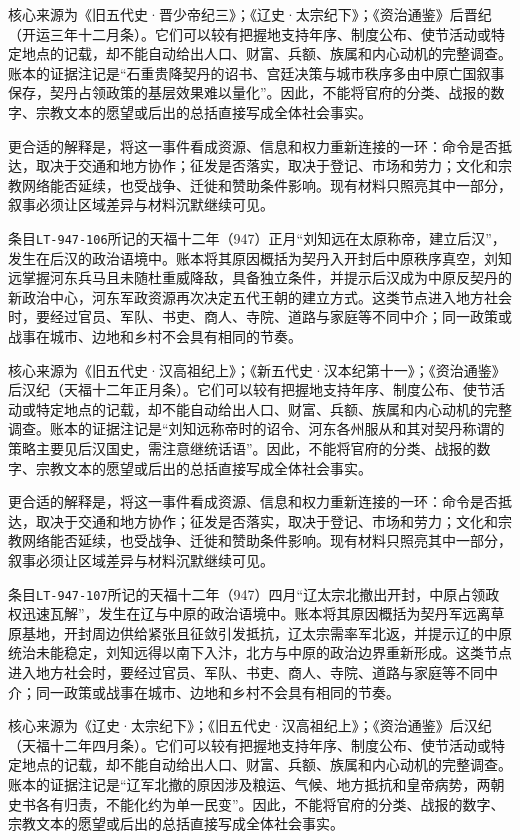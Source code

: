 核心来源为《旧五代史·晋少帝纪三》；《辽史·太宗纪下》；《资治通鉴》后晋纪（开运三年十二月条）。它们可以较有把握地支持年序、制度公布、使节活动或特定地点的记载，却不能自动给出人口、财富、兵额、族属和内心动机的完整调查。账本的证据注记是“石重贵降契丹的诏书、宫廷决策与城市秩序多由中原亡国叙事保存，契丹占领政策的基层效果难以量化”。因此，不能将官府的分类、战报的数字、宗教文本的愿望或后出的总括直接写成全体社会事实。

更合适的解释是，将这一事件看成资源、信息和权力重新连接的一环：命令是否抵达，取决于交通和地方协作；征发是否落实，取决于登记、市场和劳力；文化和宗教网络能否延续，也受战争、迁徙和赞助条件影响。现有材料只照亮其中一部分，叙事必须让区域差异与材料沉默继续可见。

条目\texttt{LT-947-106}所记的天福十二年（947）正月“刘知远在太原称帝，建立后汉”，发生在后汉的政治语境中。账本将其原因概括为契丹入开封后中原秩序真空，刘知远掌握河东兵马且未随杜重威降敌，具备独立条件，并提示后汉成为中原反契丹的新政治中心，河东军政资源再次决定五代王朝的建立方式。这类节点进入地方社会时，要经过官员、军队、书吏、商人、寺院、道路与家庭等不同中介；同一政策或战事在城市、边地和乡村不会具有相同的节奏。

核心来源为《旧五代史·汉高祖纪上》；《新五代史·汉本纪第十一》；《资治通鉴》后汉纪（天福十二年正月条）。它们可以较有把握地支持年序、制度公布、使节活动或特定地点的记载，却不能自动给出人口、财富、兵额、族属和内心动机的完整调查。账本的证据注记是“刘知远称帝时的诏令、河东各州服从和其对契丹称谓的策略主要见后汉国史，需注意继统话语”。因此，不能将官府的分类、战报的数字、宗教文本的愿望或后出的总括直接写成全体社会事实。

更合适的解释是，将这一事件看成资源、信息和权力重新连接的一环：命令是否抵达，取决于交通和地方协作；征发是否落实，取决于登记、市场和劳力；文化和宗教网络能否延续，也受战争、迁徙和赞助条件影响。现有材料只照亮其中一部分，叙事必须让区域差异与材料沉默继续可见。

条目\texttt{LT-947-107}所记的天福十二年（947）四月“辽太宗北撤出开封，中原占领政权迅速瓦解”，发生在辽与中原的政治语境中。账本将其原因概括为契丹军远离草原基地，开封周边供给紧张且征敛引发抵抗，辽太宗需率军北返，并提示辽的中原统治未能稳定，刘知远得以南下入汴，北方与中原的政治边界重新形成。这类节点进入地方社会时，要经过官员、军队、书吏、商人、寺院、道路与家庭等不同中介；同一政策或战事在城市、边地和乡村不会具有相同的节奏。

核心来源为《辽史·太宗纪下》；《旧五代史·汉高祖纪上》；《资治通鉴》后汉纪（天福十二年四月条）。它们可以较有把握地支持年序、制度公布、使节活动或特定地点的记载，却不能自动给出人口、财富、兵额、族属和内心动机的完整调查。账本的证据注记是“辽军北撤的原因涉及粮运、气候、地方抵抗和皇帝病势，两朝史书各有归责，不能化约为单一民变”。因此，不能将官府的分类、战报的数字、宗教文本的愿望或后出的总括直接写成全体社会事实。

